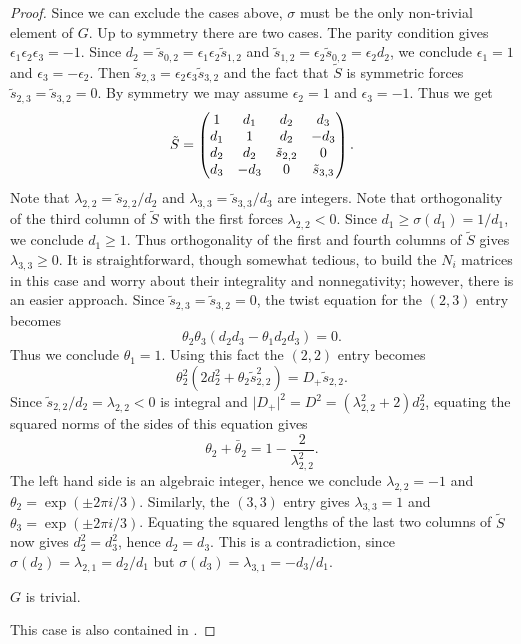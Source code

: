 \documentclass[12pt,psamsfonts]{amsart}
\newcommand{\e}{{\epsilon}}
\numberwithin{equation}{section}
\theoremstyle{definition}
\begin{document}
\begin{proof}
Since we can exclude the cases above, $\sigma$ must be the only
non-trivial element of $G$. Up to symmetry there are two cases.
The parity condition gives $\e_1\e_2\e_3=-1$. Since $d_2=\tilde
s_{0,2}=\e_1\e_2\tilde s_{1,2}$ and $\tilde s_{1,2}=\e_2 \tilde
s_{0,2}=\e_2 d_2$, we conclude $\e_1=1$ and $\e_3=-\e_2$. Then
$\tilde s_{2,3}=\e_2\e_3\tilde s_{3,2}$ and the fact that $\tilde
S$ is symmetric forces $\tilde s_{2,3}=\tilde s_{3,2}=0$. By
symmetry we may assume $\e_2=1$ and $\e_3=-1$. Thus we get
$$\tilde S=\left(\begin{matrix}1 & d_1 & d_2 & d_3\cr d_1 & 1 & d_2 &
-d_3\cr d_2 & d_2 & \tilde s_{2,2} & 0\cr d_3 & -d_3 & 0 & \tilde
s_{3,3}\end{matrix}\right).$$ Note that $\lambda_{2,2}=\tilde
s_{2,2}/d_2$ and $\lambda_{3,3}=\tilde s_{3,3}/d_3$ are integers.
Note that orthogonality of the third column of $\tilde S$ with the
first forces $\lambda_{2,2}<0$. Since $d_1\ge \sigma(d_1)=1/d_1$,
we conclude $d_1\ge 1$. Thus orthogonality of the first and fourth
columns of $\tilde S$ gives $\lambda_{3,3}\ge 0$. It is
straightforward, though somewhat tedious, to build the $N_i$
matrices in this case and worry about their integrality and
nonnegativity; however, there is an easier approach. Since $\tilde
s_{2,3}=\tilde s_{3,2}=0$, the twist equation for the $(2,3)$
entry becomes
$$\theta_2\theta_3(d_2 d_3 -\theta_1 d_2 d_3) = 0.$$
Thus we conclude $\theta_1=1$. Using this fact the $(2,2)$ entry
becomes
$$\theta_2^2(2 d_2 ^2 + \theta_2 \tilde s_{2,2}^2) = D_+ \tilde s_{2,2}.$$
Since $\tilde s_{2,2}/d_2=\lambda_{2,2}<0$ is integral and $\vert
D_+\vert^2=D^2 = (\lambda_{2,2}^2+2)d_2^2$, equating the squared
norms of the sides of this equation gives
$$\theta_2+\bar \theta_2 = 1-\frac{2}{\lambda_{2,2}^2}.$$
The left hand side is an algebraic integer, hence we conclude
$\lambda_{2,2}=-1$ and $\theta_2=\exp(\pm 2\pi i/3)$. Similarly,
the $(3,3)$ entry gives $\lambda_{3,3}=1$ and $\theta_3=\exp(\pm
2\pi i/3)$. Equating the squared lengths of the last two columns
of $\tilde S$ now gives $d_2^2=d_3^2$, hence $d_2=d_3$. This is a
contradiction, since $\sigma(d_2)=\lambda_{2,1}=d_2/d_1$ but
$\sigma(d_3)=\lambda_{3,1}=-d_3/d_1$.

\vspace{.5cm}

 $G$ is trivial.

\vspace{.5cm}

This case is also contained in \cite{CZ}.


\end{proof}
\end{document}
